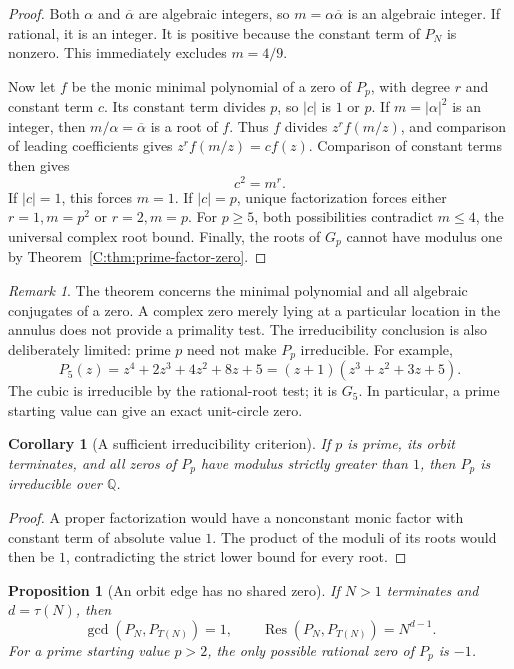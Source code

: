 \documentclass[11pt,a4paper]{article}
\newtheorem{proposition}[theorem]{Proposition}
\newtheorem{corollary}[theorem]{Corollary}
\theoremstyle{definition}
\theoremstyle{remark}
\newtheorem{remark}[theorem]{Remark}
\numberwithin{equation}{section}
\begin{document}
\begin{proof}
Both $\alpha$ and $\overline\alpha$ are algebraic integers, so
$m=\alpha\overline\alpha$ is an algebraic integer. If rational, it is an
integer. It is positive because the constant term of $P_N$ is nonzero.
This immediately excludes $m=4/9$.

Now let $f$ be the monic minimal polynomial of a zero of $P_p$, with
degree $r$ and constant term $c$. Its constant term divides $p$, so
$|c|$ is $1$ or $p$. If $m=|\alpha|^2$ is an integer, then
$m/\alpha=\overline\alpha$ is a root of $f$. Thus $f$ divides
$z^r f(m/z)$, and comparison of leading coefficients gives
$z^r f(m/z)=c f(z)$. Comparison of constant terms then gives
\[
 c^2=m^r.
\]
If $|c|=1$, this forces $m=1$. If $|c|=p$, unique factorization forces
either $r=1,m=p^2$ or $r=2,m=p$. For $p\geq5$, both possibilities
contradict $m\leq4$, the universal complex root bound. Finally, the roots
of $G_p$ cannot have modulus one by Theorem~\ref{C:thm:prime-factor-zero}.
\end{proof}

\begin{remark}
The theorem concerns the minimal polynomial and all algebraic conjugates
of a zero. A complex zero merely lying at a particular location in the
annulus does not provide a primality test. The irreducibility conclusion
is also deliberately limited: prime $p$ need not make $P_p$ irreducible.
For example,
\[
 P_5(z)=z^4+2z^3+4z^2+8z+5
       =(z+1)(z^3+z^2+3z+5).
\]
The cubic is irreducible by the rational-root test; it is $G_5$.
In particular, a prime starting value can give an exact unit-circle zero.
\end{remark}

\begin{corollary}[A sufficient irreducibility criterion]
If $p$ is prime, its orbit terminates, and all zeros of $P_p$ have modulus
strictly greater than $1$, then $P_p$ is irreducible over $\mathbb Q$.
\end{corollary}
\begin{proof}
A proper factorization would have a nonconstant monic factor with constant
term of absolute value $1$. The product of the moduli of its roots would
then be $1$, contradicting the strict lower bound for every root.
\end{proof}

\begin{proposition}[An orbit edge has no shared zero]
If $N>1$ terminates and $d=\tau(N)$, then
\[
 \gcd(P_N,P_{T(N)})=1,
 \qquad \operatorname{Res}(P_N,P_{T(N)})=N^{d-1}.
\]
For a prime starting value $p>2$, the only possible rational zero of
$P_p$ is $-1$.
\end{proposition}
\end{document}
